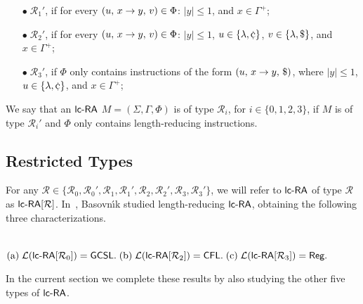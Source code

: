 \begin{itemize}
\item[$\bullet\;\mathcal{R}_1'$,] if for every $(u,\,x\rightarrow y,\,v) \in \Phi$: $|y|\le 1$, and $x \in \Gamma^+$;
\item[$\bullet\;\mathcal{R}_2'$,] if for every $(u,\,x\rightarrow y,\,v) \in \Phi$: $|y|\le 1$, $u \in \{\lambda,\leftsentinel\}$, $v \in \{\lambda,\$\}$, and $x \in \Gamma^+$;
\item[$\bullet\;\mathcal{R}_3'$,]  if $\Phi$ only contains instructions of the form $(u,\,x\rightarrow y,\,\$)$, where $|y|\le 1$, $u \in \{\lambda,\leftsentinel\}$, and $x \in \Gamma^+$;
\end{itemize}

We say that an $\lcRA$ $M=(\Sigma,\Gamma,\Phi)$ is of type $\mathcal{R}_i$, for $i \in \{0, 1, 2, 3\}$, if $M$ is of type $\mathcal{R}_i'$ and $\Phi$ only contains length-reducing instructions.

\subsection{Restricted Types}

For any $\mathcal{R} \in \{\mathcal{R}_0,\mathcal{R}_0',\mathcal{R}_1,\mathcal{R}_1',\mathcal{R}_2,\mathcal{R}_2',\mathcal{R}_3,\mathcal{R}_3'\}$, we will refer to $\lcRA$ of type $\mathcal{R}$ as ${\lcRA}[\mathcal{R}]$. In~\cite{B10Diploma}, Basovn{\'\i}k  studied length-reducing $\lcRA$, obtaining the following three characterizations.

\begin{theorem}{\rm \cite{B10Diploma}}\label{ThmBasovnik} \\[+0.2cm]
${\rm (a)}\;  {\mathcal L}(\lcRA[0]) = \GCSL.\;
{\rm (b)}\; {\mathcal L}(\lcRA[2]) = \CFL.\;
{\rm (c)}\; {\mathcal L}(\lcRA[3]) = \Reg.$
\end{theorem}

In the current section we complete these results by also studying the other five types of $\lcRA$.
\vspace{+0.2cm}

